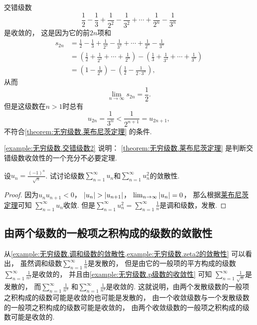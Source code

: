 \begin{example}\label{example:无穷级数.交错级数2}
交错级数\[
	\frac{1}{2} - \frac{1}{3}
	+ \frac{1}{2^2} - \frac{1}{3^2}
	+ \dotsm + \frac{1}{2^n} - \frac{1}{3^n}
\]是收敛的，
这是因为它的前\(2n\)项和\begin{align*}
	s_{2n} &= \frac{1}{2} - \frac{1}{3}
	+ \frac{1}{2^2} - \frac{1}{3^2}
	+ \dotsm + \frac{1}{2^n} - \frac{1}{3^n} \\
	&= \left(\frac{1}{2} + \frac{1}{2^2} + \dotsm + \frac{1}{2^n}\right)
	- \left(\frac{1}{3} + \frac{1}{3^2} + \dotsm + \frac{1}{3^n}\right) \\
	&= \left(1 - \frac{1}{2^n}\right)
	- \left(\frac{1}{2} - \frac{1}{2\cdot3^n}\right),
\end{align*}
从而\[
	\lim_{n\to\infty} s_{2n} = \frac{1}{2}.
\]
但是这级数在\(n>1\)时总有\[
	u_{2n} = \frac{1}{3^n} < \frac{1}{2^{n+1}} = u_{2n+1},
\]不符合\cref{theorem:无穷级数.莱布尼茨定理} 的条件.
\end{example}
\begin{remark}
\cref{example:无穷级数.交错级数2} 说明：
\cref{theorem:无穷级数.莱布尼茨定理} 是判断交错级数收敛性的一个充分不必要定理.
\end{remark}

\begin{example}\label{example:交错级数.逐项平方以后发散的特例}
设\(u_n = \frac{(-1)^n}{\sqrt{n}}\).
试讨论级数\(\sum_{n=1}^\infty u_n\)和\(\sum_{n=1}^\infty u_n^2\)的敛散性.
\begin{proof}
因为\(u_n u_{n+1} < 0\)，
\(\abs{u_n} > \abs{u_{n+1}}\)，
\(\lim_{n\to\infty} \abs{u_n} = 0\)，
那么根据\hyperref[theorem:无穷级数.莱布尼茨定理]{莱布尼茨定理}可知
\(\sum_{n=1}^\infty u_n\)收敛.
但是\(\sum_{n=1}^\infty u_n^2
= \sum_{n=1}^\infty \frac{1}{n}\)是调和级数，发散.
\end{proof}
\end{example}

\subsection{由两个级数的一般项之积构成的级数的敛散性}
从\cref{example:无穷级数.调和级数的敛散性,example:无穷级数.zeta2的敛散性} 可以看出，
虽然调和级数\(\sum_{n=1}^\infty \frac1n\)是发散的，
但是由它的一般项的平方构成的级数\(\sum_{n=1}^\infty \frac1{n^2}\)是收敛的，
并且由\cref{example:无穷级数.p级数的收敛性} 可知
\(\sum_{n=1}^\infty \frac1{\sqrt{n}}\)是发散的，
而\(\sum_{n=1}^\infty \frac1{n^3}\)
和\(\sum_{n=1}^\infty \frac1{n^4}\)是收敛的.
这就说明，由两个发散级数的一般项之积构成的级数可能是收敛的也可能是发散的，
由一个收敛级数与一个发散级数的一般项之积构成的级数可能是收敛的，
由两个收敛级数的一般项之积构成的级数可能是收敛的.

